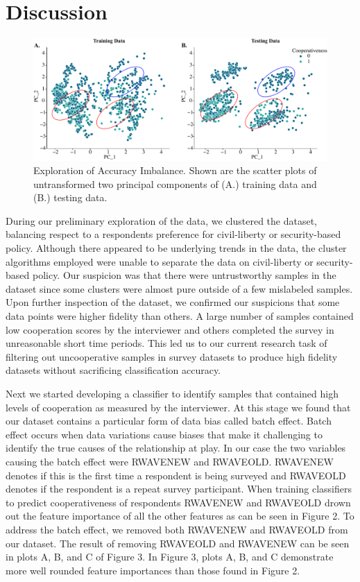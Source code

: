 \section{Discussion}
\begin{figure}[ht!]
    \centering
    \includegraphics[width=\linewidth]{Figures/Figure6.pdf}
    \caption{Exploration of Accuracy Imbalance. Shown are the scatter plots of untransformed two principal components of (A.) training data and (B.) testing data.}
    \label{fig:figure6}
\end{figure} 

During our preliminary exploration of the data, we clustered the dataset, balancing respect to a respondents preference for civil-liberty or security-based policy. Although there appeared to be underlying trends in the data, the cluster algorithms employed were unable to separate the data on civil-liberty or security-based policy. Our suspicion was that there were untrustworthy samples in the dataset since some clusters were almost pure outside of a few mislabeled samples. Upon further inspection of the dataset, we confirmed our suspicions that some data points were higher fidelity than others. A large number of samples contained low cooperation scores by the interviewer and others completed the survey in unreasonable short time periods. This led us to our current research task of filtering out uncooperative samples in survey datasets to produce high fidelity datasets without sacrificing classification accuracy. 

Next we started developing a classifier to identify samples that contained high levels of cooperation as measured by the interviewer. At this stage we found that our dataset contains a particular form of data bias called batch effect. Batch effect occurs when data variations cause biases that make it challenging to identify the true causes of the relationship at play. In our case the two variables causing the batch effect were RWAVENEW and RWAVEOLD. RWAVENEW denotes if this is the first time a respondent is being surveyed and RWAVEOLD denotes if the respondent is a repeat survey participant. When training classifiers to predict cooperativeness of respondents RWAVENEW and RWAVEOLD drown out the feature importance of all the other features as can be seen in Figure 2. To address the batch effect, we removed both RWAVENEW and RWAVEOLD from our dataset. The result of removing RWAVEOLD and RWAVENEW can be seen in plots A, B, and C of Figure 3. In Figure 3, plots A, B, and C demonstrate more well rounded feature importances than those found in Figure 2. 

